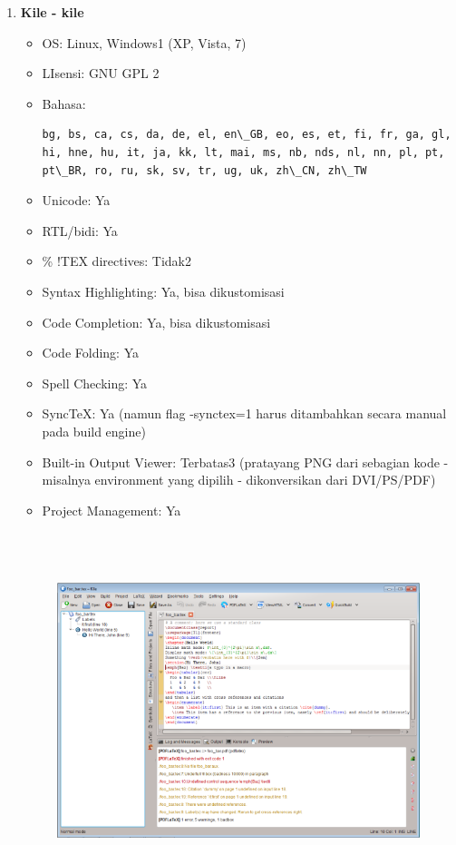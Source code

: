 \begin{enumerate}
\item \textbf{Kile - kile}
\begin{itemize}
\item OS: Linux, Windows1 (XP, Vista, 7)
\item LIsensi: GNU GPL 2
\item Bahasa: 
\begin{verbatim}bg, bs, ca, cs, da, de, el, en\_GB, eo, es, et, fi, fr, ga, gl, hi, hne, hu, it, ja, kk, lt, mai, ms, nb, nds, nl, nn, pl, pt, pt\_BR, ro, ru, sk, sv, tr, ug, uk, zh\_CN, zh\_TW
\end{verbatim}
\item Unicode: Ya
\item RTL/bidi: Ya
\item \% !TEX directives: Tidak2
\item Syntax Highlighting: Ya, bisa dikustomisasi
\item Code Completion: Ya, bisa dikustomisasi
\item Code Folding: Ya
\item Spell Checking: Ya
\item SyncTeX: Ya (namun flag -synctex=1 harus ditambahkan secara manual pada build engine)
\item Built-in Output Viewer: Terbatas3 (pratayang PNG dari sebagian kode - misalnya environment yang dipilih - dikonversikan dari DVI/PS/PDF)
\item Project Management: Ya
\end{itemize}
\begin{figure}[ht]

\includegraphics[width=14.76cm,height=10.39cm]{gambar/image6.jpg}
\end{figure}



\end{enumerate}
